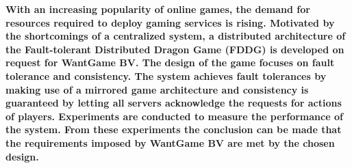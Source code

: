\textbf{With an increasing popularity of online games, the demand for resources required to deploy gaming services is rising.
	Motivated by the shortcomings of a centralized system, a distributed architecture of the Fault-tolerant Distributed Dragon Game (FDDG) is developed on request for WantGame BV. 
	The design of the game focuses on fault tolerance and consistency.
	The system achieves fault tolerances by making use of a mirrored game architecture and consistency is guaranteed by letting all servers acknowledge the requests for actions of players. 
	Experiments are conducted to measure the performance of the system.
	From these experiments the conclusion can be made that the requirements imposed by WantGame BV are met by the chosen design.}